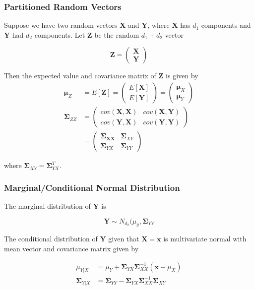 \documentclass{beamer}
\begin{document}
\begin{frame}
\frametitle{Partitioned Random Vectors}
Suppose we have two random vectors $\mathbf{X}$ and $\mathbf{Y}$, where $\mathbf{X}$ has $d_1$ components and $\mathbf{Y}$ had $d_2$ components.  Let $\mathbf{Z}$ be the random $d_1 + d_2$ vector

$$\mathbf{Z} = \begin{pmatrix} \mathbf{X}  \\ \mathbf{Y} \end{pmatrix}$$

Then the expected value and covariance matrix of $\mathbf{Z}$ is given by 
\begin{align*}
\mathbf{\mu}_Z &= E[\mathbf{Z}] = \begin{pmatrix} E[\mathbf{X}] \\ E[\mathbf{Y}] \end{pmatrix} = \begin{pmatrix} \mathbf{\mu}_X \\ \mathbf{\mu}_Y \end{pmatrix}\\
\mathbf{\Sigma}_{ZZ} &= \begin{pmatrix} cov(\mathbf{X}, \mathbf{X}) & cov(\mathbf{X}, \mathbf{Y}) \\ cov(\mathbf{Y}, \mathbf{X}) & cov(\mathbf{Y}, \mathbf{Y})  \end{pmatrix}\\
&= \begin{pmatrix}
\mathbf{\Sigma_{XX}} & \mathbf{\Sigma}_{XY}\\
\mathbf{\Sigma}_{YX} & \mathbf{\Sigma}_{YY}
\end{pmatrix}
\end{align*}

where $\mathbf{\Sigma}_{XY} = \mathbf{\Sigma}_{YX}^T$. 
\end{frame}

\begin{frame}
\frametitle{Marginal/Conditional Normal Distribution}
The marginal distribution of $\mathbf{Y}$ is

$$\mathbf{Y} \sim N_{d_2}(\mu_y, \mathbf{\Sigma}_{YY}$$

The conditional distribution of $\mathbf{Y}$ given that $\mathbf{X} = \mathbf{x}$ is multivariate normal with mean vector and covariance matrix given by

\begin{align*}
\mu_{Y|X} &= \mu_Y + \mathbf{\Sigma}_{YX} \mathbf{\Sigma}_{XX}^{-1} (\mathbf{x} - \mu_X)\\
\mathbf{\Sigma}_{Y|X} &= \mathbf{\Sigma}_{YY} - \mathbf{\Sigma}_{YX}\mathbf{\Sigma}_{XX}^{-1}\mathbf{\Sigma}_{XY}
\end{align*}

\end{frame}
\end{document}

